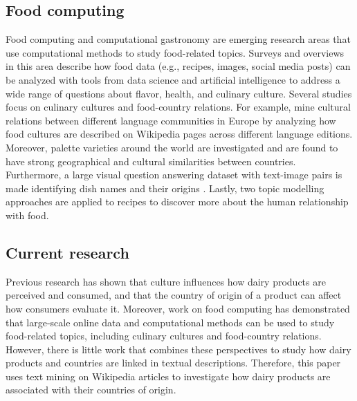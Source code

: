 \documentclass[sigconf]{acmart-txmm}
\begin{document}
\subsection{Food computing}
Food computing and computational gastronomy are emerging research areas that use computational methods to study food-related topics.
Surveys and overviews in this area \cite{GoelMansi2022CgAd,MinWeiqing2020ASoF} describe how food data (e.g., recipes, images, social media posts) can be analyzed with tools from data science and artificial intelligence to address a wide range of questions about flavor, health, and culinary culture.
Several studies focus on culinary cultures and food-country relations.
For example, \citeauthor{LauferPaul2015Mcrf} \cite{LauferPaul2015Mcrf} mine cultural relations between different language communities in Europe by analyzing how food cultures are described on Wikipedia pages across different language editions.
Moreover, palette varieties around the world are investigated \cite{SajadmaneshSina2017KCEW} and are found to have strong geographical and cultural similarities between countries.
Furthermore, a large visual question answering dataset with text-image pairs is made identifying dish names and their origins \cite{WinataGentaIndra2024WAMB}.
Lastly, two topic modelling approaches are applied to recipes \cite{MinWeiqing2018YAWY, KāleMaija2021UoLR} to discover more about the human relationship with food.

\subsection{Current research}
Previous research has shown that culture influences how dairy products are perceived and consumed, and that the country of origin of a product can affect how consumers evaluate it.
Moreover, work on food computing has demonstrated that large-scale online data and computational methods can be used to study food-related topics, including culinary cultures and food-country relations.
However, there is little work that combines these perspectives to study how dairy products and countries are linked in textual descriptions.
Therefore, this paper uses text mining on Wikipedia articles to investigate how dairy products are associated with their countries of origin.

\end{document}
